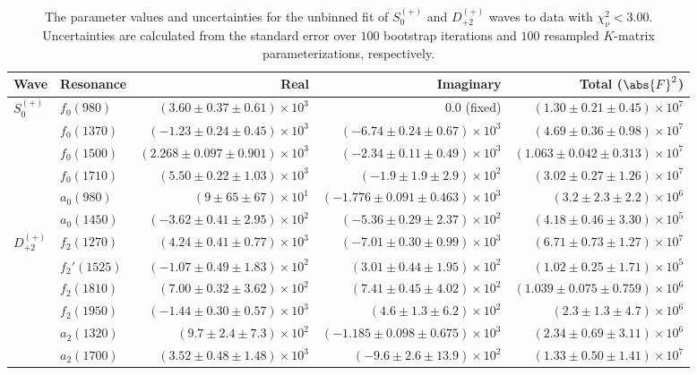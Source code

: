 \begin{table}[ht]
    \begin{center}
        \begin{tabular}{llrrr}\toprule
        Wave & Resonance & Real & Imaginary & Total ($\abs{F}^2$) \\\midrule
$S_{0}^{(+)}$ & $f_{0}(980)$ & $(3.60 \pm 0.37 \pm 0.61) \times 10^{3}$ & $0.0$ (fixed) & $(1.30 \pm 0.21 \pm 0.45) \times 10^{7}$ \\
 & $f_{0}(1370)$ & $(-1.23 \pm 0.24 \pm 0.45) \times 10^{3}$ & $(-6.74 \pm 0.24 \pm 0.67) \times 10^{3}$ & $(4.69 \pm 0.36 \pm 0.98) \times 10^{7}$ \\
 & $f_{0}(1500)$ & $(2.268 \pm 0.097 \pm 0.901) \times 10^{3}$ & $(-2.34 \pm 0.11 \pm 0.49) \times 10^{3}$ & $(1.063 \pm 0.042 \pm 0.313) \times 10^{7}$ \\
 & $f_{0}(1710)$ & $(5.50 \pm 0.22 \pm 1.03) \times 10^{3}$ & $(-1.9 \pm 1.9 \pm 2.9) \times 10^{2}$ & $(3.02 \pm 0.27 \pm 1.26) \times 10^{7}$ \\
 & $a_{0}(980)$ & $(9 \pm 65 \pm 67) \times 10^{1}$ & $(-1.776 \pm 0.091 \pm 0.463) \times 10^{3}$ & $(3.2 \pm 2.3 \pm 2.2) \times 10^{6}$ \\
 & $a_{0}(1450)$ & $(-3.62 \pm 0.41 \pm 2.95) \times 10^{2}$ & $(-5.36 \pm 0.29 \pm 2.37) \times 10^{2}$ & $(4.18 \pm 0.46 \pm 3.30) \times 10^{5}$ \\
$D_{+2}^{(+)}$ & $f_{2}(1270)$ & $(4.24 \pm 0.41 \pm 0.77) \times 10^{3}$ & $(-7.01 \pm 0.30 \pm 0.99) \times 10^{3}$ & $(6.71 \pm 0.73 \pm 1.27) \times 10^{7}$ \\
 & $f_{2}'(1525)$ & $(-1.07 \pm 0.49 \pm 1.83) \times 10^{2}$ & $(3.01 \pm 0.44 \pm 1.95) \times 10^{2}$ & $(1.02 \pm 0.25 \pm 1.71) \times 10^{5}$ \\
 & $f_{2}(1810)$ & $(7.00 \pm 0.32 \pm 3.62) \times 10^{2}$ & $(7.41 \pm 0.45 \pm 4.02) \times 10^{2}$ & $(1.039 \pm 0.075 \pm 0.759) \times 10^{6}$ \\
 & $f_{2}(1950)$ & $(-1.44 \pm 0.30 \pm 0.57) \times 10^{3}$ & $(4.6 \pm 1.3 \pm 6.2) \times 10^{2}$ & $(2.3 \pm 1.3 \pm 4.7) \times 10^{6}$ \\
 & $a_{2}(1320)$ & $(9.7 \pm 2.4 \pm 7.3) \times 10^{2}$ & $(-1.185 \pm 0.098 \pm 0.675) \times 10^{3}$ & $(2.34 \pm 0.69 \pm 3.11) \times 10^{6}$ \\
 & $a_{2}(1700)$ & $(3.52 \pm 0.48 \pm 1.48) \times 10^{3}$ & $(-9.6 \pm 2.6 \pm 13.9) \times 10^{2}$ & $(1.33 \pm 0.50 \pm 1.41) \times 10^{7}$ \\\bottomrule
        \end{tabular}
    \caption{The parameter values and uncertainties for the unbinned fit of $S_{0}^{(+)}$ and $D_{+2}^{(+)}$ waves to data with $\chi^2_\nu < 3.00$. Uncertainties are calculated from the standard error over $100$ bootstrap iterations and $100$ resampled $K$-matrix parameterizations, respectively.}\label{tab:unbinned-fit-chisqdof-3.0-resampled-Sp0p-Dp2p}
    \end{center}
\end{table}
